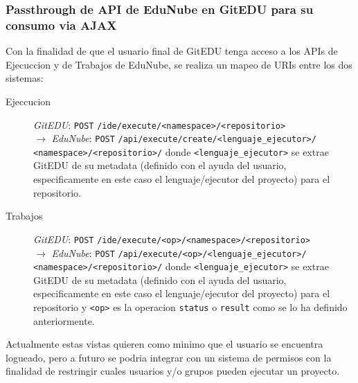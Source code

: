 \subsubsection{Passthrough de API de EduNube en GitEDU para su consumo via AJAX}
Con la finalidad de que el usuario final de GitEDU tenga acceso a los APIs de Ejecuccion y de Trabajos de EduNube, se realiza un mapeo de URIs entre los dos sistemas:
\begin{description}
	\item[Ejeccucion] \textit{GitEDU}: \texttt{POST} \texttt{/ide/execute/<namespace>/<repositorio>} \\
    $\rightarrow$ \textit{EduNube}: \texttt{POST} \texttt{/api/execute/create/<lenguaje\_ejecutor>/} \\
    \texttt{<namespace>/<repositorio>/} donde \texttt{<lenguaje\_ejecutor>} se extrae GitEDU de su metadata (definido con el ayuda del usuario, especificamente en este caso el lenguaje/ejecutor del proyecto) para el repositorio.
    \item[Trabajos] \textit{GitEDU}: \texttt{POST} \texttt{/ide/execute/<op>/<namespace>/<repositorio>} \\
    $\rightarrow$ \textit{EduNube}: \texttt{POST} \texttt{/api/execute/<op>/<lenguaje\_ejecutor>/} \\
    \texttt{<namespace>/<repositorio>/} donde \texttt{<lenguaje\_ejecutor>} se extrae GitEDU de su metadata (definido con el ayuda del usuario, especificamente en este caso el lenguaje/ejecutor del proyecto) para el repositorio y \texttt{<op>} es la operacion \texttt{status} o \texttt{result} como se lo ha definido anteriormente.
\end{description}
Actualmente estas vistas quieren como minimo que el usuario se encuentra logueado, pero a futuro se podria integrar con un sistema de permisos con la finalidad de restringir cuales usuarios y/o grupos pueden ejecutar un proyecto.
